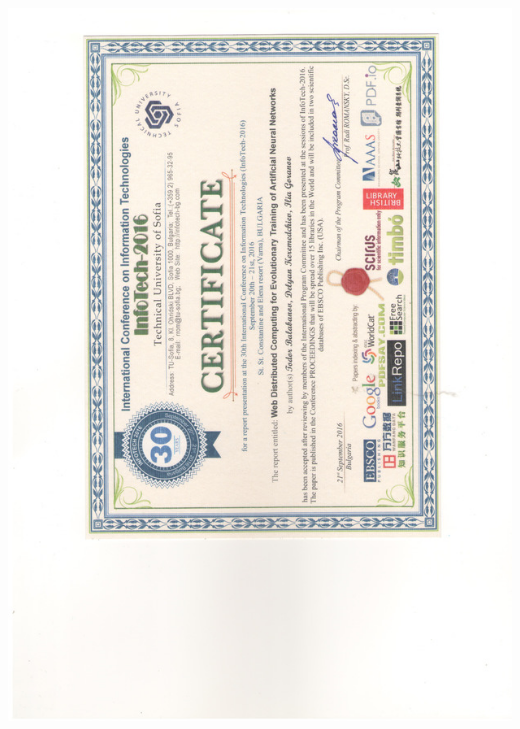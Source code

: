 \documentclass[english,a4paper]{europasscv}
\begin{document}
\includegraphics[width=\textwidth,height=\textheight,keepaspectratio]{InfoTech2016}
\end{document}
